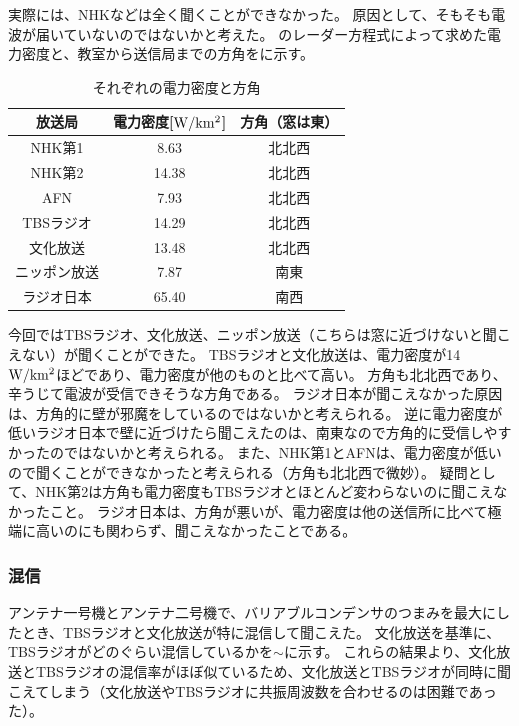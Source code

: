 \documentclass[report.tex]{subfiles}
\begin{document}
実際には、NHKなどは全く聞くことができなかった。
原因として、そもそも電波が届いていないのではないかと考えた。
のレーダー方程式によって求めた電力密度と、教室から送信局までの方角をに示す。

\begin{table}[H]
	\centering
	\caption{それぞれの電力密度と方角}
	\label{tab:aaa}
	\begin{tabular}{ccc} \hline
		放送局    & 電力密度[\(\rm{W/km^2}\)] & 方角（窓は東） \\ \hline
		NHK第1  & 8.63                  & 北北西     \\
		NHK第2  & 14.38                 & 北北西     \\
		AFN    & 7.93                  & 北北西     \\
		TBSラジオ & 14.29                 & 北北西     \\
		文化放送   & 13.48                 & 北北西     \\
		ニッポン放送 & 7.87                  & 南東      \\
		ラジオ日本  & 65.40                 & 南西      \\ \hline
	\end{tabular}
\end{table}

今回ではTBSラジオ、文化放送、ニッポン放送（こちらは窓に近づけないと聞こえない）が聞くことができた。
TBSラジオと文化放送は、電力密度が14 \(\rm{W/km^2}\)ほどであり、電力密度が他のものと比べて高い。
方角も北北西であり、辛うじて電波が受信できそうな方角である。
ラジオ日本が聞こえなかった原因は、方角的に壁が邪魔をしているのではないかと考えられる。
逆に電力密度が低いラジオ日本で壁に近づけたら聞こえたのは、南東なので方角的に受信しやすかったのではないかと考えられる。
また、NHK第1とAFNは、電力密度が低いので聞くことができなかったと考えられる（方角も北北西で微妙）。
疑問として、NHK第2は方角も電力密度もTBSラジオとほとんど変わらないのに聞こえなかったこと。
ラジオ日本は、方角が悪いが、電力密度は他の送信所に比べて極端に高いのにも関わらず、聞こえなかったことである。

\subsubsection{混信}

アンテナ一号機とアンテナ二号機で、バリアブルコンデンサのつまみを最大にしたとき、TBSラジオと文化放送が特に混信して聞こえた。
文化放送を基準に、TBSラジオがどのぐらい混信しているかを\(\sim\)に示す。
これらの結果より、文化放送とTBSラジオの混信率がほぼ似ているため、文化放送とTBSラジオが同時に聞こえてしまう（文化放送やTBSラジオに共振周波数を合わせるのは困難であった）。
\end{document}
